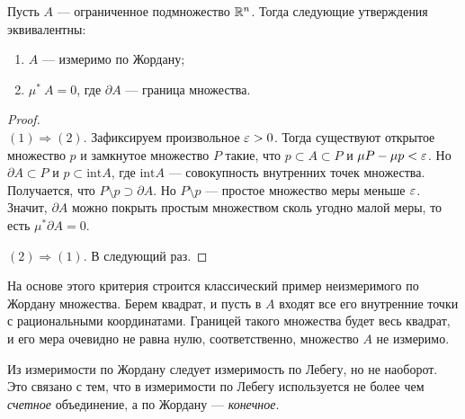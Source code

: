 \begin{Statement}
Пусть $A$ --- ограниченное подмножество $\mathbb{R}^n$. Тогда следующие утверждения эквивалентны:
\begin{enumerate}
\item $A$ --- измеримо по Жордану;
\item $\mu^* \ A = 0$, где $\partial
 A$ --- граница множества.
\end{enumerate}
\end{Statement}
\begin{proof}\ \\
$(1) \Rightarrow (2)$. Зафиксируем произвольное $\varepsilon > 0$. Тогда существуют открытое множество $p$ и замкнутое множество $P$ такие, что $p \subset A \subset P$ и $\mu P- \mu p < \varepsilon$. Но $\partial
 A \subset P$ и $p \subset \mathrm{int} A$, где $\mathrm{int} A$ --- совокупность внутренних точек множества. Получается, что $P \setminus p \supset \partial
 A$. Но $P \setminus p$ --- простое множество меры меньше $\varepsilon$. Значит, $\partial
 A$ можно покрыть простым множеством сколь угодно малой меры, то есть $\mu^* \partial
 A = 0$.

$(2) \Rightarrow (1)$. В следующий раз.
\end{proof}

\begin{Comment}
На основе этого критерия строится классический пример неизмеримого по Жордану множества. Берем квадрат, и пусть в $A$ входят все его внутренние точки с рациональными координатами. Границей такого множества будет весь квадрат, и его мера очевидно не равна нулю, соответственно, множество $A$ не измеримо.
\end{Comment}
\begin{Comment}
Из измеримости по Жордану следует измеримость по Лебегу, но не наоборот. Это связано с тем, что в измеримости по Лебегу используется не более чем \textit{счетное} объединение, а по Жордану --- \textit{конечное}.
\end{Comment}